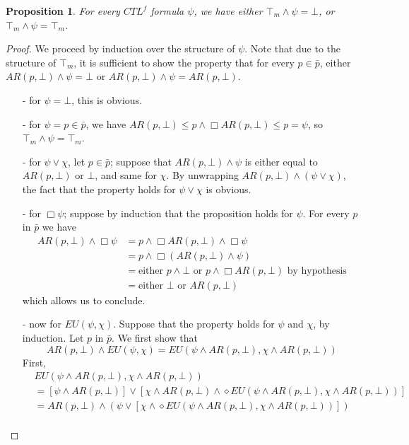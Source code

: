 \documentclass[10pt]{article}
\newcommand{\ARp}{{AR(p,\bot)}}
\newtheorem{proposition}[definition]{Proposition}
\begin{document}
\begin{proposition}\label{top_m}
    For every $CTL^f$ formula $\psi$, we have either $\top_m\wedge\psi=\bot$, or $\top_m\wedge\psi=\top_m$.
\end{proposition}
\begin{proof}
    We proceed by induction over the structure of $\psi$. Note that due to the structure of $\top_m$, it is sufficient to show the property that for every $p\in\bar{p}$, either $\ARp\wedge\psi=\bot$ or $\ARp\wedge\psi=\ARp$.
    \begin{itemize}
        \setlength\itemsep{0em}
        \item[-] for $\psi = \bot$, this is obvious.
        \item[-] for $\psi = p\in\bar{p}$, we have $AR(p,\bot)\leq p\wedge\Box AR(p,\bot)\leq p=\psi$, so $\top_m\wedge\psi=\top_m$.
        \item[-] for $\psi\vee\chi$, let $p\in\bar{p}$; suppose that $\ARp\wedge\psi$ is either equal to $\ARp$ or $\bot$, and same for $\chi$. By unwrapping $\ARp\wedge(\psi\vee\chi)$, the fact that the property holds for $\psi\vee\chi$ is obvious.
        \item[-] for $\Box\psi$; suppose by induction that the proposition holds for $\psi$. For every $p$ in $\bar{p}$ we have
            \begin{align*}
                AR(p,\bot)\wedge\Box\psi&=p\wedge\Box AR(p,\bot)\wedge\Box\psi \\
                &=p\wedge\Box(AR(p,\bot)\wedge\psi) \\
                &=\mbox{either }p\wedge \bot \mbox{ or }p\wedge \Box AR(p,\bot)\mbox{ by hypothesis} \\
                &=\mbox{either }\bot \mbox{ or } AR(p,\bot)
            \end{align*}
            which allows us to conclude.
        \item[-] now for $EU(\psi,\chi)$. Suppose that the property holds for $\psi$ and $\chi$, by induction. Let $p$ in $\bar{p}$. We first show that \[AR(p,\bot)\wedge EU(\psi,\chi)=EU(\psi\wedge AR(p,\bot),\chi\wedge AR(p,\bot))\]
            First, 
            \begin{align*}
                &EU(\psi\wedge AR(p,\bot),\chi\wedge AR(p,\bot))\\
                &=[\psi\wedge\ARp]\vee[\chi\wedge\ARp\wedge\diamond EU(\psi\wedge AR(p,\bot),\chi\wedge AR(p,\bot))]\\
                &=\ARp\wedge(\psi\vee[\chi\wedge \diamond EU(\psi\wedge AR(p,\bot),\chi\wedge AR(p,\bot))])\\

\end{align*}
\end{itemize}
\end{proof}
\end{document}

